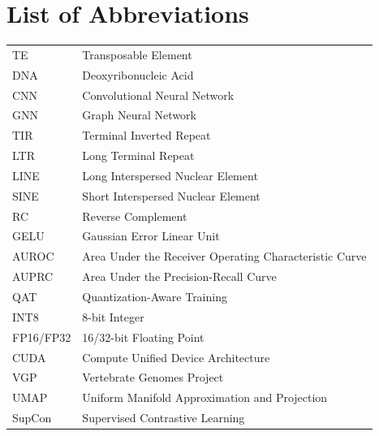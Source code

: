 \documentclass[12pt]{article}
\begin{document}
\newpage
\tableofcontents

\newpage
\section*{List of Abbreviations}

\begin{tabular}{ll}
    TE & Transposable Element \\
    DNA & Deoxyribonucleic Acid \\
    CNN & Convolutional Neural Network \\
    GNN & Graph Neural Network \\
    TIR & Terminal Inverted Repeat \\
    LTR & Long Terminal Repeat \\
    LINE & Long Interspersed Nuclear Element \\
    SINE & Short Interspersed Nuclear Element \\
    RC & Reverse Complement \\
    GELU & Gaussian Error Linear Unit \\
    AUROC & Area Under the Receiver Operating Characteristic Curve \\
    AUPRC & Area Under the Precision-Recall Curve \\
    QAT & Quantization-Aware Training \\
    INT8 & 8-bit Integer \\
    FP16/FP32 & 16/32-bit Floating Point \\
    CUDA & Compute Unified Device Architecture \\
    VGP & Vertebrate Genomes Project \\
    UMAP & Uniform Manifold Approximation and Projection \\
    SupCon & Supervised Contrastive Learning \\
\end{tabular}

\iffalse

\end{document}
